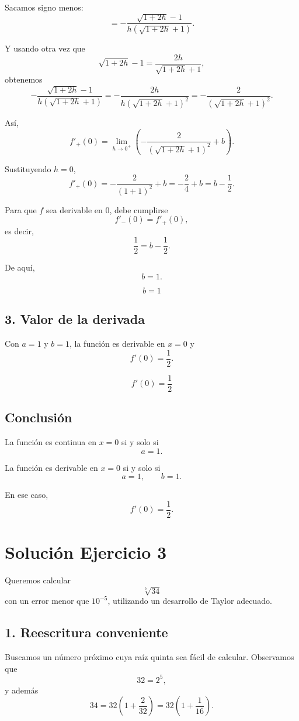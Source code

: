 \documentclass[12pt]{article}
\begin{document}
Sacamos signo menos:
\[
=
-\frac{\sqrt{1+2h}-1}{h(\sqrt{1+2h}+1)}.
\]

Y usando otra vez que
\[
\sqrt{1+2h}-1=\frac{2h}{\sqrt{1+2h}+1},
\]
obtenemos
\[
-\frac{\sqrt{1+2h}-1}{h(\sqrt{1+2h}+1)}
=
-\frac{2h}{h(\sqrt{1+2h}+1)^2}
=
-\frac{2}{(\sqrt{1+2h}+1)^2}.
\]

Así,
\[
f'_+(0)
=
\lim_{h\to 0^+}
\left(
-\frac{2}{(\sqrt{1+2h}+1)^2}+b
\right).
\]

Sustituyendo \(h=0\),
\[
f'_+(0)
=
-\frac{2}{(1+1)^2}+b
=
-\frac{2}{4}+b
=
b-\frac12.
\]

Para que \(f\) sea derivable en \(0\), debe cumplirse
\[
f'_-(0)=f'_+(0),
\]
es decir,
\[
\frac12=b-\frac12.
\]

De aquí,
\[
b=1.
\]

\[
\boxed{b=1}
\]

\subsection*{3. Valor de la derivada}

Con \(a=1\) y \(b=1\), la función es derivable en \(x=0\) y
\[
f'(0)=\frac12.
\]

\[
\boxed{f'(0)=\frac12}
\]

\subsection*{Conclusión}

La función es continua en \(x=0\) si y solo si
\[
\boxed{a=1}.
\]

La función es derivable en \(x=0\) si y solo si
\[
\boxed{a=1,\qquad b=1}.
\]

En ese caso,
\[
\boxed{f'(0)=\frac12}.
\]

\newpage

\section*{Solución Ejercicio 3}

Queremos calcular
\[
\sqrt[5]{34}
\]
con un error menor que \(10^{-5}\), utilizando un desarrollo de Taylor adecuado.

\subsection*{1. Reescritura conveniente}

Buscamos un número próximo cuya raíz quinta sea fácil de calcular. Observamos que
\[
32=2^5,
\]
y además
\[
34=32\left(1+\frac{2}{32}\right)=32\left(1+\frac{1}{16}\right).
\]
\end{document}
